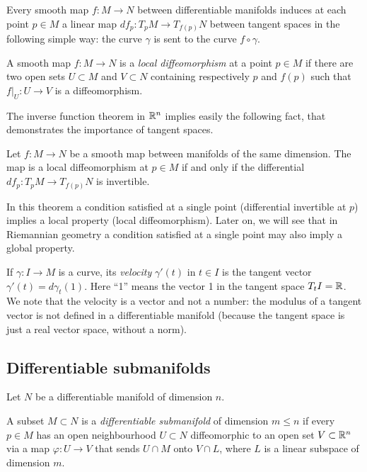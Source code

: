 Every smooth map $f\colon M \to N$ between differentiable manifolds induces at each point $p\in M$ a linear map $df_p\colon T_pM \to T_{f(p)} N$ between tangent spaces in the following simple way: the curve $\gamma$ is sent to the curve $f\circ\gamma$.

\begin{defn} A smooth map $f\colon M \to N$ is a \emph{local diffeomorphism} at a point $p \in M$ if there are two open sets $U\subset M$ and $V\subset N$ containing respectively $p$ and $f(p)$ such that $f|_U\colon U \to V$ is a diffeomorphism.
\end{defn}

The inverse function theorem in $\mathbb{R}^n$ implies easily the following fact, that demonstrates the importance of tangent spaces.

\begin{teo}
Let $f\colon M \to N$ be a smooth map between manifolds of the same dimension. The map is a local diffeomorphism at $p\in M$ if and only if the differential $df_p\colon T_pM \to T_{f(p)}N$ is invertible.
\end{teo}

In this theorem a condition satisfied at a single point (differential invertible at $p$) implies a local property (local diffeomorphism). Later on, we will see that in Riemannian geometry a condition satisfied at a single point may also imply a global property.

If $\gamma\colon I \to M$ is a curve, its \emph{velocity} $\gamma'(t)$ in $t\in I$ is the tangent vector $\gamma'(t) = d\gamma_t(1)$. Here ``1'' means the vector 1 in the tangent space $T_tI = \mathbb{R}$. We note that the velocity is a vector and not a number: the modulus of a tangent vector is not defined in a differentiable manifold (because the tangent space is just a real vector space, without a norm).

\subsection{Differentiable submanifolds}
Let $N$ be a differentiable manifold of dimension $n$. 
\begin{defn}
A subset $M\subset N$ is a \emph{differentiable submanifold} of dimension $m\leqslant n$ if every $p\in M$ has an open neighbourhood $U\subset N$ diffeomorphic to an open set $V\subset \mathbb{R}^n$ via a map $\varphi\colon U \to V$ that sends $U\cap M$ onto $V\cap L$, where $L$ is a linear subspace of dimension $m$.
\end{defn}


